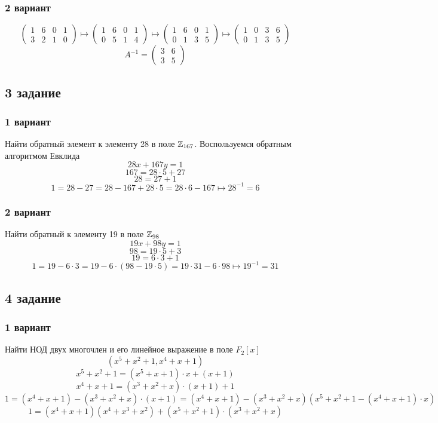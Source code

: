 \subsubsection{2 вариант}
\[ \left( \begin{array}{cc|cc}
		1 & 6 &0 & 1\\
		3 & 2 & 1 & 0 
\end{array}\right) \longmapsto  \left( \begin{array}{cc|cc}
		1 & 6 &0 & 1\\
		0 & 5 & 1 & 4 
\end{array}\right)\longmapsto  \left( \begin{array}{cc|cc}
		1 & 6 &0 & 1\\
		0 & 1 & 3 & 5 
\end{array}\right)\longmapsto   \left( \begin{array}{cc|cc}
		1 & 0 &3 & 6\\
		0 & 1 & 3 & 5 
\end{array}\right)
\]
$$A^{-1} = \begin{pmatrix}3 & 6 \\3 & 5\end{pmatrix}$$
\subsection{3 задание }
\subsubsection{1 вариант}
Найти обратный элемент к элементу 28 в поле $\mathbb{Z}_{167}$. Воспользуемся обратным алгоритмом Евклида
$$28x+167y = 1$$
$$167 = 28\cdot5 + 27$$
$$28 = 27+1$$
$$1 = 28-27 = 28- 167+28\cdot5 = 28\cdot6 -167\longmapsto 28^{-1} = 6$$
\subsubsection{2 вариант}
Найти обратный к элементу 19 в поле $\mathbb{Z}_{98}$
$$19x+98y = 1$$
$$98 = 19\cdot5 + 3$$
$$19 = 6\cdot3+1$$
$$1 = 19-6\cdot3 = 19-6\cdot\left(98-19\cdot5\right) = 19\cdot 31 -6\cdot98\longmapsto 19^{-1} = 31$$
\subsection{4 задание}
\subsubsection{1 вариант}
Найти НОД двух многочлен и его линейное выражение в поле $F_2[x]$\\
$$\left(x^5+x^2+1, x^4+x+1\right)$$
$$x^5+x^2+1 = \left(x^5+x+1\right)\cdot x + \left(x+1\right)$$
$$x^4+x+1 = \left(x^3+x^2+x\right)\cdot\left(x+1\right)+1$$
$$1 = \left(x^4+x+1\right)- \left(x^3+x^2+x\right)\cdot\left(x+1\right) = \left(x^4+x+1\right)-\left(x^3+x^2+x\right)\left(x^5+x^2+1-(x^4+x+1)\cdot x\right)$$
$$1 = \left(x^4+x+1\right)\left(x^4+x^3+x^2\right)+\left(x^5+x^2+1\right)\cdot\left(x^3+x^2+x\right)$$

